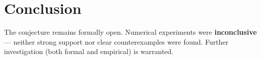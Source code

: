 \documentclass[11pt]{article}
\begin{document}
\section{Conclusion}

The conjecture remains formally open. Numerical experiments were \textbf{inconclusive} --- neither strong support nor clear counterexamples were found.
Further investigation (both formal and empirical) is warranted.
\end{document}
